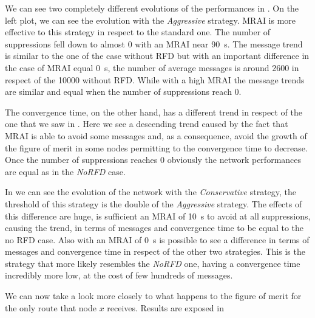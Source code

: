 We can see two completely different evolutions of the performances in .
On the left plot, we can see the evolution with the \textit{Aggressive} strategy.
\ac{MRAI} is more effective to this strategy in respect to the standard one.
The number of suppressions fell down to almost \num{0} with an \ac{MRAI} near
\SI{90}{\second}.
The message trend is similar to the one of the case without \ac{RFD} but with an
important difference in the case of  \ac{MRAI} equal \SI{0}{\second}, the number
of average messages is around \num{2600} in respect of the \num{10000} without
\ac{RFD}.
While with a high \ac{MRAI} the message trends are similar and equal when the number of
suppressions reach \num{0}.

The convergence time, on the other hand, has a different trend in respect of
the one that we saw in .
Here we see a descending trend caused by the fact that \ac{MRAI} is able to avoid
some messages and, as a consequence, avoid the growth of the figure of merit in
some nodes permitting to the convergence time to decrease.
Once the number of suppressions reaches \num{0} obviously the network performances
are equal as in the \textit{NoRFD} case.

In  we can see the evolution of the network with the
\textit{Conservative} strategy, the threshold of this strategy is the double of
the \textit{Aggressive} strategy.
The effects of this difference are huge, is sufficient an \ac{MRAI} of \SI{10}{\second}
to avoid at all suppressions, causing the trend, in terms of messages and
convergence time to be equal to the no \ac{RFD} case.
Also with an \ac{MRAI} of \SI{0}{\second} is possible to see a difference in
terms of messages and convergence time in respect of the other two strategies.
This is the strategy that more likely resembles the \textit{NoRFD} one,
having a convergence time incredibly more low, at the cost of few hundreds of messages.

We can now take a look more closely to what happens to the figure of merit
for the only route that node $x$ receives.
Results are exposed in 

